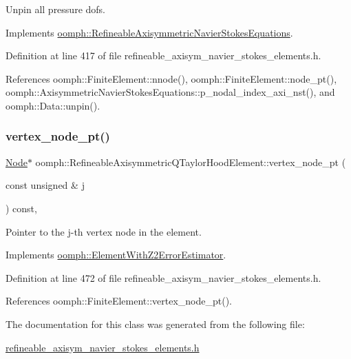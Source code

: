 Unpin all pressure dofs. 



Implements \hyperlink{classoomph_1_1RefineableAxisymmetricNavierStokesEquations_a01009bc617cad72b7467b5e947e7be88}{oomph\+::\+Refineable\+Axisymmetric\+Navier\+Stokes\+Equations}.



Definition at line 417 of file refineable\+\_\+axisym\+\_\+navier\+\_\+stokes\+\_\+elements.\+h.



References oomph\+::\+Finite\+Element\+::nnode(), oomph\+::\+Finite\+Element\+::node\+\_\+pt(), oomph\+::\+Axisymmetric\+Navier\+Stokes\+Equations\+::p\+\_\+nodal\+\_\+index\+\_\+axi\+\_\+nst(), and oomph\+::\+Data\+::unpin().

\mbox{\label{classoomph_1_1RefineableAxisymmetricQTaylorHoodElement_a1ab3ad8214ed275ea748d6a37fde086d}} 
\subsubsection{\texorpdfstring{vertex\+\_\+node\+\_\+pt()}{vertex\_node\_pt()}}
{\footnotesize\ttfamily \hyperlink{classoomph_1_1Node}{Node}$\ast$ oomph\+::\+Refineable\+Axisymmetric\+Q\+Taylor\+Hood\+Element\+::vertex\+\_\+node\+\_\+pt (\begin{DoxyParamCaption}\item[{const unsigned \&}]{j }\end{DoxyParamCaption}) const\hspace{0.3cm}{\ttfamily [inline]}, {\ttfamily [virtual]}}



Pointer to the j-\/th vertex node in the element. 



Implements \hyperlink{classoomph_1_1ElementWithZ2ErrorEstimator_a0eedccc33519f852c5dc2055ddf2774b}{oomph\+::\+Element\+With\+Z2\+Error\+Estimator}.



Definition at line 472 of file refineable\+\_\+axisym\+\_\+navier\+\_\+stokes\+\_\+elements.\+h.



References oomph\+::\+Finite\+Element\+::vertex\+\_\+node\+\_\+pt().



The documentation for this class was generated from the following file\+:\begin{DoxyCompactItemize}
\item 
\hyperlink{refineable__axisym__navier__stokes__elements_8h}{refineable\+\_\+axisym\+\_\+navier\+\_\+stokes\+\_\+elements.\+h}\end{DoxyCompactItemize}
